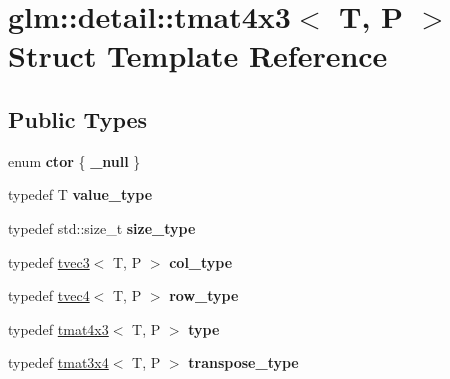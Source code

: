 \hypertarget{structglm_1_1detail_1_1tmat4x3}{\section{glm\-:\-:detail\-:\-:tmat4x3$<$ T, P $>$ Struct Template Reference}
\label{structglm_1_1detail_1_1tmat4x3}
}
\subsection*{Public Types}
\begin{DoxyCompactItemize}
\item 
enum {\bfseries ctor} \{ {\bfseries \-\_\-null}
 \}
\item 
\hypertarget{structglm_1_1detail_1_1tmat4x3_a059eb027e7aebee491c0edcf17235557}{typedef T {\bfseries value\-\_\-type}}\label{structglm_1_1detail_1_1tmat4x3_a059eb027e7aebee491c0edcf17235557}

\item 
\hypertarget{structglm_1_1detail_1_1tmat4x3_aceab433265627d5787fe291463d19b91}{typedef std\-::size\-\_\-t {\bfseries size\-\_\-type}}\label{structglm_1_1detail_1_1tmat4x3_aceab433265627d5787fe291463d19b91}

\item 
\hypertarget{structglm_1_1detail_1_1tmat4x3_a58afd510f7ab968e5a86e20f2f3979de}{typedef \hyperlink{structglm_1_1detail_1_1tvec3}{tvec3}$<$ T, P $>$ {\bfseries col\-\_\-type}}\label{structglm_1_1detail_1_1tmat4x3_a58afd510f7ab968e5a86e20f2f3979de}

\item 
\hypertarget{structglm_1_1detail_1_1tmat4x3_a4c401c9b82fb80f9646813f0d9c1c70e}{typedef \hyperlink{structglm_1_1detail_1_1tvec4}{tvec4}$<$ T, P $>$ {\bfseries row\-\_\-type}}\label{structglm_1_1detail_1_1tmat4x3_a4c401c9b82fb80f9646813f0d9c1c70e}

\item 
\hypertarget{structglm_1_1detail_1_1tmat4x3_aee33430c6a618f2452a740cd4a509a03}{typedef \hyperlink{structglm_1_1detail_1_1tmat4x3}{tmat4x3}$<$ T, P $>$ {\bfseries type}}\label{structglm_1_1detail_1_1tmat4x3_aee33430c6a618f2452a740cd4a509a03}

\item 
\hypertarget{structglm_1_1detail_1_1tmat4x3_a80f4669c67e4c9fb3e9f44d3dcf439d2}{typedef \hyperlink{structglm_1_1detail_1_1tmat3x4}{tmat3x4}$<$ T, P $>$ {\bfseries transpose\-\_\-type}}\label{structglm_1_1detail_1_1tmat4x3_a80f4669c67e4c9fb3e9f44d3dcf439d2}

\end{DoxyCompactItemize}
